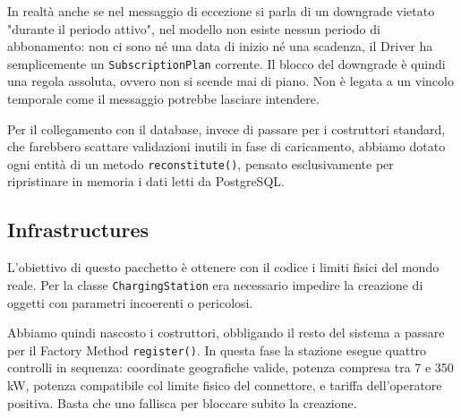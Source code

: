 In realtà anche se nel messaggio di eccezione  si parla di un downgrade vietato "durante il periodo attivo", nel modello non esiste nessun periodo di abbonamento: non ci sono né una data di inizio né una scadenza, il Driver ha semplicemente un \texttt{SubscriptionPlan} corrente. Il blocco del downgrade è quindi una regola assoluta, ovvero non si scende mai di piano. Non è legata a un vincolo temporale come il messaggio potrebbe lasciare intendere.

Per il collegamento con il database, invece di passare per i costruttori standard, che farebbero scattare validazioni inutili in fase di caricamento, abbiamo dotato ogni entità di un metodo \texttt{reconstitute()}, pensato esclusivamente per ripristinare in memoria i dati letti da PostgreSQL.

\subsection{Infrastructures}
L'obiettivo di questo pacchetto è ottenere con il codice i limiti fisici del mondo reale. Per la classe \texttt{ChargingStation} era necessario impedire la creazione di oggetti con parametri incoerenti o pericolosi.

Abbiamo quindi nascosto i costruttori, obbligando il resto del sistema a passare per il Factory Method \texttt{register()}. In questa fase la stazione esegue quattro controlli in sequenza: coordinate geografiche valide, potenza compresa tra 7 e 350 kW, potenza compatibile col limite fisico del connettore, e tariffa dell'operatore positiva. Basta che uno fallisca per bloccare subito la creazione.

